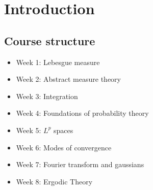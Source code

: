 \documentclass{article}
\newcommand{\1}[1]{\mathbbm{1}_{#1}}
\begin{document}
\maketitle
\section{Introduction}
\subsection{Course structure}
\begin{itemize}
    \item Week 1: Lebesgue measure
    \item Week 2: Abstract measure theory
    \item Week 3: Integration
    \item Week 4: Foundations of probability theory
    \item Week 5: $L^p$ spaces
    \item Week 6: Modes of convergence
    \item Week 7: Fourier transform and gaussians
    \item Week 8: Ergodic Theory
\end{itemize}
\end{document}
